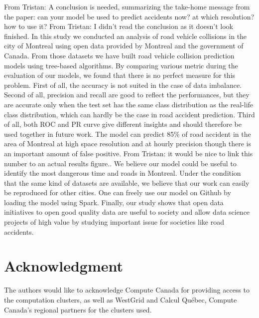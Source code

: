 \documentclass[conference]{IEEEtran}
\newcommand{\TG}[1]{\colorlet{saved}{.}\color{orange}From Tristan: #1\color{saved}}
\begin{document}
\TG{A conclusion is needed, summarizing the take-home message from the paper:
can your model be used to predict accidents now? at which resolution? how to use it?}
\TG{I didn't read the conclusion as it doesn't look finished.}
In this study we conducted an analysis of road vehicle collisions in the city of Montreal using open data provided by Montreal and the government of Canada. From those datasets we have built road vehicle collision prediction models using tree-based algorithms. By comparing various metric during the evaluation of our models, we found that there is no perfect measure for this problem. First of all, the accuracy is not suited in the case of data imbalance. Second of all, precision and recall are good to reflect the performances, but they are accurate only when the test set has the same class distribution as the real-life class distribution, which can hardly be the case in road accident prediction. Third of all, both ROC and PR curve give different insights and should therefore be used together in future work. The model can predict 85\% of road accident in the area of Montreal at high space resolution and at hourly precision though there is an important amount of false positive. \TG{it would be nice to link this number to an actual results figure.}. We believe our model could be useful to identify the most dangerous time and roads in Montreal. Under the condition that the same kind of datasets are available, we believe that our work can easily be reproduced for other cities. One can freely use our model on Github by loading the model using Spark. Finally, our study shows that open data initiatives to open good quality data are useful to society and allow data science projects of high value by studying important issue for societies like road accidents. 

\section*{Acknowledgment}

The authors would like to acknowledge Compute Canada for providing access to the computation clusters, as well as WestGrid and Calcul Québec, Compute Canada's regional partners for the clusters used.



\end{document}
